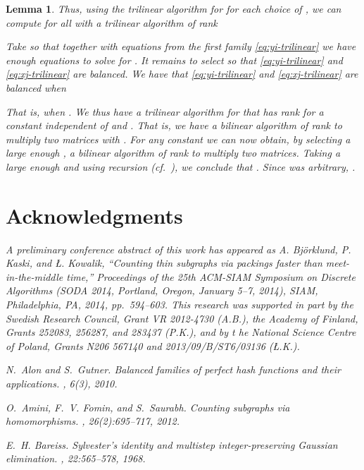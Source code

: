 \documentclass{amsart}
\newtheorem{Lem}{Lemma}
\begin{document}
\begin{Lem}
Thus, using the trilinear algorithm for  
for each choice of , we can compute 
 for all  with a trilinear algorithm of rank

Take  so that together with equations 
from the first family \eqref{eq:yi-trilinear} we have enough equations 
to solve for . It remains to select  so that 
\eqref{eq:yi-trilinear} and \eqref{eq:xj-trilinear} are balanced.
We have that \eqref{eq:yi-trilinear} and 
\eqref{eq:xj-trilinear} are balanced when

That is, when . We thus have a trilinear algorithm 
for  that has rank  for a 
constant  independent of  and .
That is, we have a bilinear algorithm of rank 
 to multiply two  matrices
with . For any constant  we can now
obtain, by selecting a large enough , a bilinear algorithm of
rank  to multiply two  matrices.
Taking a large enough  and using recursion 
(cf.~\cite[Theorem~2.1]{Pan1984}), we conclude that 
. Since  was arbitrary,
.




\section*{Acknowledgments}

A preliminary conference abstract of this work has appeared as A. Bj\"orklund, P. Kaski, and \L. Kowalik, ``Counting thin subgraphs via packings faster than meet-in-the-middle time,'' Proceedings of the 25th ACM-SIAM Symposium on Discrete Algorithms (SODA 2014, Portland, Oregon, January 5--7, 2014), SIAM, Philadelphia, PA, 2014, pp.~594--603.
This research was supported in part by the 
Swedish Research Council, Grant VR 2012-4730 (A.B.),
the Academy of Finland, Grants 252083, 256287, and 283437 (P.K.), and 
by t	he National Science Centre of Poland, Grants N206 567140 and 2013/09/B/ST6/03136 (\L.K.).





\begin{thebibliography}{10}

N.~Alon and S.~Gutner.
\newblock Balanced families of perfect hash functions and their applications.
, 6(3), 2010.

O.~Amini, F.~V. Fomin, and S.~Saurabh.
\newblock Counting subgraphs via homomorphisms.
, 26(2):695--717, 2012.

E.~H. Bareiss.
\newblock Sylvester's identity and multistep integer-preserving {G}aussian
  elimination.
, 22:565--578, 1968.


\end{thebibliography}
\end{Lem}
\end{document}
